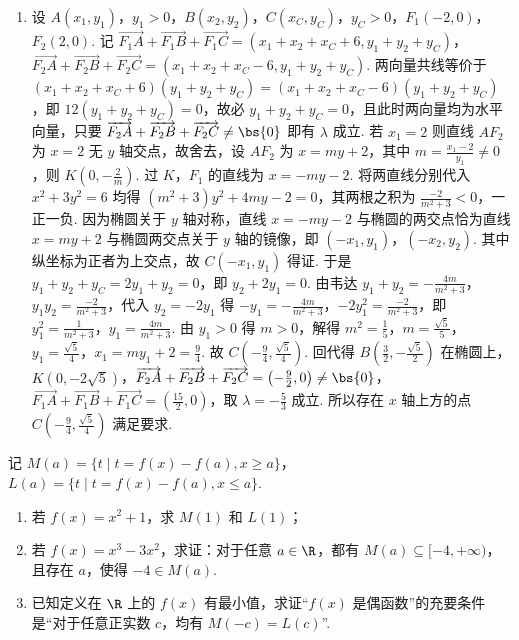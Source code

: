 \begin{solution}
\begin{enumerate}
\item 设 \(A\left(x_1,y_1\right)\)，\(y_1>0\)，\(B\left(x_2,y_2\right)\)，\(C\left(x_C,y_C\right)\)，\(y_C>0\)，\(F_1\left(-2,0\right)\)，\(F_2\left(2,0\right)\). 记 \(\overrightarrow{F_1A}+\overrightarrow{F_1B}+\overrightarrow{F_1C}=\left(x_1+x_2+x_C+6,y_1+y_2+y_C\right)\)，\(\overrightarrow{F_2A}+\overrightarrow{F_2B}+\overrightarrow{F_2C}=\left(x_1+x_2+x_C-6,y_1+y_2+y_C\right)\). 两向量共线等价于 \(\left(x_1+x_2+x_C+6\right)\left(y_1+y_2+y_C\right)=\left(x_1+x_2+x_C-6\right)\left(y_1+y_2+y_C\right)\)，即 \(12\left(y_1+y_2+y_C\right)=0\)，故必 \(y_1+y_2+y_C=0\)，且此时两向量均为水平向量，只要 \(\overrightarrow{F_2A}+\overrightarrow{F_2B}+\overrightarrow{F_2C}\ne \bs{0}\) 即有 \(\lambda\) 成立. 若 \(x_1=2\) 则直线 \(AF_2\) 为 \(x=2\) 无 \(y\) 轴交点，故舍去，设 \(AF_2\) 为 \(x=my+2\)，其中 \(m=\frac{x_1-2}{y_1}\ne 0\)，则 \(K\left(0,-\frac{2}{m}\right)\). 过 \(K\)，\(F_1\) 的直线为 \(x=-my-2\). 将两直线分别代入 \(x^2+3y^2=6\) 均得 \(\left(m^2+3\right)y^2+4my-2=0\)，其两根之积为 \(\frac{-2}{m^2+3}<0\)，一正一负. 因为椭圆关于 \(y\) 轴对称，直线 \(x=-my-2\) 与椭圆的两交点恰为直线 \(x=my+2\) 与椭圆两交点关于 \(y\) 轴的镜像，即 \(\left(-x_1,y_1\right)\)，\(\left(-x_2,y_2\right)\). 其中纵坐标为正者为上交点，故 \(C\left(-x_1,y_1\right)\) 得证. 于是 \(y_1+y_2+y_C=2y_1+y_2=0\)，即 \(y_2+2y_1=0\). 由韦达 \(y_1+y_2=-\frac{4m}{m^2+3}\)，\(y_1y_2=\frac{-2}{m^2+3}\)，代入 \(y_2=-2y_1\) 得 \(-y_1=-\frac{4m}{m^2+3}\)，\(-2y_1^2=\frac{-2}{m^2+3}\)，即 \(y_1^2=\frac{1}{m^2+3}\)，\(y_1=\frac{4m}{m^2+3}\). 由 \(y_1>0\) 得 \(m>0\)，解得 \(m^2=\frac{1}{5}\)，\(m=\frac{\sqrt{5}}{5}\)，\(y_1=\frac{\sqrt{5}}{4}\)，\(x_1=my_1+2=\frac{9}{4}\). 故 \(C\left(-\frac{9}{4},\frac{\sqrt{5}}{4}\right)\). 回代得 \(B\left(\frac{3}{2},-\frac{\sqrt{5}}{2}\right)\) 在椭圆上，\(K\left(0,-2\sqrt{5}\right)\)，\(\overrightarrow{F_2A}+\overrightarrow{F_2B}+\overrightarrow{F_2C}=\left(-\frac{9}{2},0\right)\ne \bs{0}\)，\(\overrightarrow{F_1A}+\overrightarrow{F_1B}+\overrightarrow{F_1C}=\left(\frac{15}{2},0\right)\)，取 \(\lambda=-\frac{5}{3}\) 成立. 所以存在 \(x\) 轴上方的点 \(C\left(-\frac{9}{4},\frac{\sqrt{5}}{4}\right)\) 满足要求.
\end{enumerate}
\end{solution}

\begin{problem}
记 \(M(a)=\{t\mid t=f(x)-f(a),x\ge a\}\)，\(L(a)=\{t\mid t=f(x)-f(a),x\le a\}\).

\begin{enumerate}
\item 若 \(f(x)=x^2+1\)，求 \(M(1)\) 和 \(L(1)\)；
\item 若 \(f(x)=x^3-3x^2\)，求证：对于任意 \(a\in\R\)，都有 \(M(a)\subseteq[-4,+\infty)\)，且存在 \(a\)，使得 \(-4\in M(a)\).
\item 已知定义在 \(\R\) 上的 \(f(x)\) 有最小值，求证“\(f(x)\) 是偶函数”的充要条件是“对于任意正实数 \(c\)，均有 \(M(-c)=L(c)\)”.
\end{enumerate}
\end{problem}

